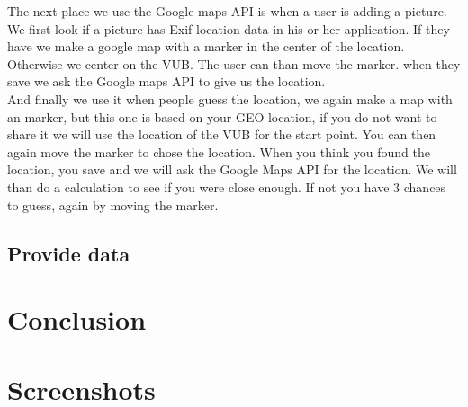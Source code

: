 \documentclass[11pt, oneside]{article}   	%
\begin{document}
The next place we use the Google maps API is when a user is adding a picture. We first look if a picture has Exif location data in his or her application. If they have we make a google map with a marker in the center of the location. Otherwise we center on the VUB. The user can than move the marker. when they save we ask the Google maps API to give us the location. \\

And finally we use it when people guess the location, we again make a map with an marker, but this one is based on your GEO-location, if you do not want to share it we will use the location of the VUB for the start point. You can then again move the marker to chose the location. When you think you found the location, you save and we will ask the Google Maps API for the location. We will than do a calculation to see if you were close enough. If not you have 3 chances to guess, again by moving the marker. \\


\subsection{Provide data}

\section{Conclusion}

\clearpage
\section{Screenshots}
\end{document}
